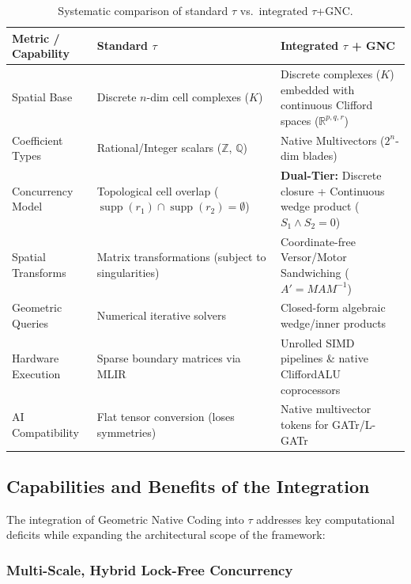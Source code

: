 \documentclass[manuscript, nonacm, review=false]{acmart}
\theoremstyle{definition}
\theoremstyle{plain}
\newcommand{\R}{\mathbb{R}}
\newcommand{\Z}{\mathbb{Z}}
\newcommand{\Q}{\mathbb{Q}}
\newcommand{\supp}{\operatorname{supp}}
\newcommand{\toposLang}{\ensuremath{\tau}\text{-Lang}}
\begin{document}
\begin{table}[h]
\centering
\small
\renewcommand{\arraystretch}{1.3}
\begin{tabular}{@{}p{3.5cm}p{4.5cm}p{5cm}@{}}
\toprule
\textbf{Metric / Capability} & \textbf{Standard \toposLang{}} & \textbf{Integrated \toposLang{} + GNC} \\
\midrule
Spatial Base & Discrete $n$-dim cell complexes ($K$) & Discrete complexes ($K$) embedded with continuous Clifford spaces ($\R^{p,q,r}$) \\
\addlinespace
Coefficient Types & Rational/Integer scalars ($\Z$, $\Q$) & Native Multivectors ($2^n$-dim blades) \\
\addlinespace
Concurrency Model & Topological cell overlap ($\supp(r_1) \cap \supp(r_2) = \emptyset$) & \textbf{Dual-Tier:} Discrete closure + Continuous wedge product ($S_1 \wedge S_2 = 0$) \\
\addlinespace
Spatial Transforms & Matrix transformations (subject to singularities) & Coordinate-free Versor/Motor Sandwiching ($A' = MAM^{-1}$) \\
\addlinespace
Geometric Queries & Numerical iterative solvers & Closed-form algebraic wedge/inner products \\
\addlinespace
Hardware Execution & Sparse boundary matrices via MLIR & Unrolled SIMD pipelines \& native CliffordALU coprocessors \\
\addlinespace
AI Compatibility & Flat tensor conversion (loses symmetries) & Native multivector tokens for GATr/L-GATr \\
\bottomrule
\end{tabular}
\caption{Systematic comparison of standard \toposLang{} vs.\ integrated \toposLang{}+GNC.}
\label{tab:comparison}
\end{table}

\subsection{Capabilities and Benefits of the Integration}
\label{subsec:benefits}

The integration of Geometric Native Coding into \toposLang{} addresses key computational deficits while expanding the architectural scope of the framework:

\subsubsection{Multi-Scale, Hybrid Lock-Free Concurrency}
\end{document}
